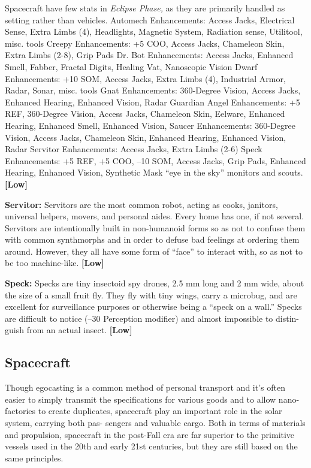Spacecraft have few stats in \textit{Eclipse Phase,} as they 
are primarily handled as setting rather than vehicles. 
Automech
Enhancements: Access Jacks, Electrical Sense, Extra Limbs (4), Headlights, Magnetic System, Radiation sense, Utilitool, misc. tools
Creepy 
Enhancements:\textbf{ }+5 COO, Access Jacks, Chameleon Skin, Extra Limbs (2-8), Grip Pads
Dr. Bot
Enhancements:\textbf{ }Access Jacks, Enhanced Smell, Fabber, Fractal Digits, Healing Vat, Nanoscopic Vision
Dwarf
Enhancements:\textbf{ }+10 SOM, Access Jacks, Extra Limbs (4), Industrial Armor, Radar, Sonar, misc. tools
Gnat
Enhancements:\textbf{ }360-Degree Vision, Access Jacks, Enhanced Hearing, Enhanced Vision, Radar
Guardian Angel
Enhancements: +5 REF, 360-Degree Vision, Access Jacks, Chameleon Skin, Eelware, Enhanced Hearing, Enhanced Smell, Enhanced Vision, 
Saucer
Enhancements:\textbf{ }360-Degree Vision, Access Jacks, Chameleon Skin, Enhanced Hearing, Enhanced Vision, Radar
Servitor
Enhancements:\textbf{ }Access Jacks, Extra Limbs (2-6)
Speck
Enhancements: +5 REF, +5 COO, –10 SOM, Access Jacks, Grip Pads, Enhanced Hearing, Enhanced Vision, Synthetic Mask
``eye in the sky'' monitors and scouts. \textbf{[Low]}

\textbf{Servitor:  }Servitors are the most common robot, 
acting as cooks, janitors, universal helpers, movers, 
and personal aides. Every home has one, if not several. 
Servitors are intentionally built in non-humanoid 
forms so as not to confuse them with common 
synthmorphs and in order to defuse bad feelings at 
ordering them around. However, they all have some 
form of ``face'' to interact with, so as not to be too 
machine-like. \textbf{[Low]}

\textbf{Speck:} Specks are tiny insectoid spy drones, 2.5 mm 
long and 2 mm wide, about the size of a small fruit fly. 
They fly with tiny wings, carry a microbug, and are 
excellent for surveillance purposes or otherwise being 
a ``speck on a wall.'' Specks are difficult to notice (–30 
Perception modifier) and almost impossible to distin-
guish from an actual insect. \textbf{[Low]}

\subsection{Spacecraft}

Though egocasting is a common method of personal 
transport and it's often easier to simply transmit the 
specifications for various goods and to allow nano-
factories to create duplicates, spacecraft play an 
important role in the solar system, carrying both pas-
sengers and valuable cargo. Both in terms of materials 
and propulsion, spacecraft in the post-Fall era are far 
superior to the primitive vessels used in the 20th and 
early 21st centuries, but they are still based on the 
same principles.

